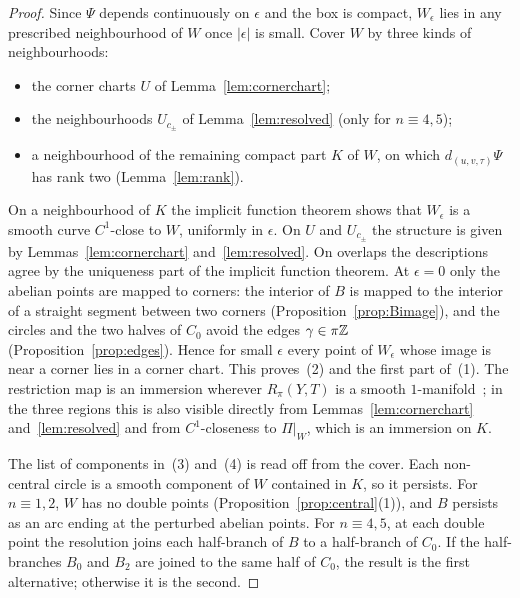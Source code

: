 \begin{proof}
Since $\Psi$ depends continuously on $\epsilon$ and the box is compact, $W_\epsilon$ lies in any prescribed
neighbourhood of $W$ once $|\epsilon|$ is small. Cover $W$ by three kinds of neighbourhoods:
\begin{itemize}
\item the corner charts $U$ of Lemma~\ref{lem:cornerchart};
\item the neighbourhoods $U_{c_\pm}$ of Lemma~\ref{lem:resolved} (only for $n\equiv4,5$);
\item a neighbourhood of the remaining compact part $K$ of $W$, on which $d_{(u,v,\tau)}\Psi$ has rank two
(Lemma~\ref{lem:rank}).
\end{itemize}
On a neighbourhood of $K$ the implicit function theorem shows that $W_\epsilon$ is a smooth curve $C^1$-close to $W$,
uniformly in $\epsilon$. On $U$ and $U_{c_\pm}$ the structure is given by Lemmas~\ref{lem:cornerchart}
and~\ref{lem:resolved}. On overlaps the descriptions agree by the uniqueness part of the implicit function
theorem. At $\epsilon=0$ only the abelian points are mapped to corners: the interior of $B$ is mapped to the
interior of a straight segment between two corners (Proposition~\ref{prop:Bimage}), and the circles and the
two halves of $C_0$ avoid the edges $\gamma\in\pi\mathbb{Z}$ (Proposition~\ref{prop:edges}). Hence for small $\epsilon$ every point of
$W_\epsilon$ whose image is near a corner lies in a corner chart. This proves~(2) and the first part of~(1). The
restriction map is an immersion wherever $R_\pi(Y,T)$ is a smooth $1$-manifold~\cite[p.~46, after
Thm.~8.4]{HHK2}; in the three regions this is also visible directly from Lemmas~\ref{lem:cornerchart}
and~\ref{lem:resolved} and from $C^1$-closeness to $\Pi|_W$, which is an immersion on $K$.

The list of components in~(3) and~(4) is read off from the cover. Each non-central circle is a smooth component of
$W$ contained in $K$, so it persists. For $n\equiv1,2$, $W$ has no double points (Proposition~\ref{prop:central}(1)),
and $B$ persists as an arc ending at the perturbed abelian points. For $n\equiv4,5$, at each double point the
resolution joins each half-branch of $B$ to a half-branch of $C_0$. If the half-branches $B_0$ and $B_2$ are joined
to the same half of $C_0$, the result is the first alternative; otherwise it is the second.
\end{proof}

